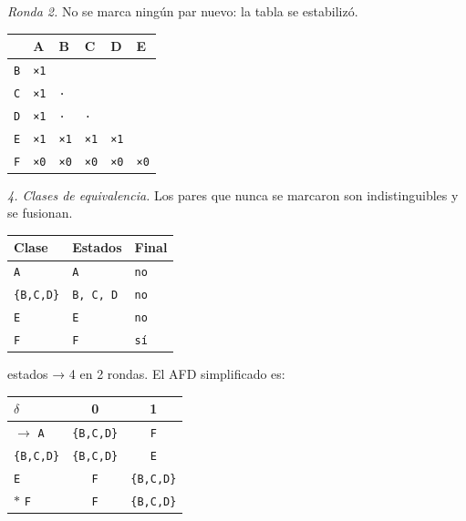 \documentclass[11pt]{article}
\begin{document}
\textit{Ronda 2.} No se marca ningún par nuevo: la tabla se estabilizó.
\begin{center}\footnotesize\begin{tabular}{llllll}\toprule
 & A & B & C & D & E \\\midrule
\texttt{B} & \texttt{×1} & \texttt{} & \texttt{} & \texttt{} & \texttt{} \\
\texttt{C} & \texttt{×1} & \texttt{·} & \texttt{} & \texttt{} & \texttt{} \\
\texttt{D} & \texttt{×1} & \texttt{·} & \texttt{·} & \texttt{} & \texttt{} \\
\texttt{E} & \texttt{×1} & \texttt{×1} & \texttt{×1} & \texttt{×1} & \texttt{} \\
\texttt{F} & \texttt{×0} & \texttt{×0} & \texttt{×0} & \texttt{×0} & \texttt{×0} \\
\bottomrule\end{tabular}\end{center}
\textit{4. Clases de equivalencia.} Los pares que nunca se marcaron son indistinguibles y se fusionan.
\begin{center}\footnotesize\begin{tabular}{lll}\toprule
Clase & Estados & Final \\\midrule
\texttt{A} & \texttt{A} & \texttt{no} \\
\texttt{\{B,C,D\}} & \texttt{B, C, D} & \texttt{no} \\
\texttt{E} & \texttt{E} & \texttt{no} \\
\texttt{F} & \texttt{F} & \texttt{sí} \\
\bottomrule\end{tabular}\end{center}

 estados → 4 en 2 rondas. El AFD simplificado es:
\begin{center}\small\begin{tabular}{lcc}\toprule
$\delta$ & 0 & 1 \\\midrule
$\to$ \texttt{A} & \texttt{\{B,C,D\}} & \texttt{F} \\
 \texttt{\{B,C,D\}} & \texttt{\{B,C,D\}} & \texttt{E} \\
 \texttt{E} & \texttt{F} & \texttt{\{B,C,D\}} \\
$*$ \texttt{F} & \texttt{F} & \texttt{\{B,C,D\}} \\
\bottomrule\end{tabular}\end{center}
\end{document}
